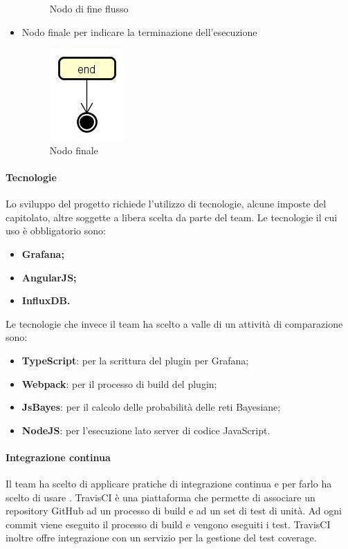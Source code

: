 \begin{itemize}
\begin{figure} [H]
		\caption{Nodo di fine flusso}\label{}
	\end{figure}
	\item Nodo finale per indicare la terminazione dell'esecuzione
	\begin{figure} [H]
		\centering
		\includegraphics[scale=0.8]{./Img/attivita_fine.jpg}
		\caption{Nodo finale}\label{}
	\end{figure}
	
\end{itemize}

\paragraph{Tecnologie}\Spazio
Lo sviluppo del progetto richiede l'utilizzo di tecnologie, alcune imposte del capitolato, altre soggette a libera scelta da parte del team.
Le tecnologie il cui uso è obbligatorio sono:
\begin{itemize}
\item\textbf{{Grafana;}}
\item\textbf{{AngularJS;}}
\item\textbf{{InfluxDB.}}
\end{itemize}
Le tecnologie che invece il team ha scelto a valle di un attività di comparazione sono:
\begin{itemize}
\item\textbf{{TypeScript}}: per la scrittura del plugin per Grafana;
\item\textbf{{Webpack}}: per il processo di build del plugin;
\item\textbf{{JsBayes}}: per il calcolo delle probabilità delle reti Bayesiane;
\item\textbf{{NodeJS}}: per l'esecuzione lato server di codice JavaScript.
\end{itemize}
\paragraph{Integrazione continua}\Spazio
Il team ha scelto di applicare pratiche di integrazione continua e per farlo ha scelto di usare .
TravisCI è una piattaforma che permette di associare un repository GitHub ad un processo di build e ad un set di test di unità.
Ad ogni commit viene eseguito il processo di build e vengono eseguiti i test. TravisCI inoltre offre integrazione con  un
servizio per la gestione del test coverage.
